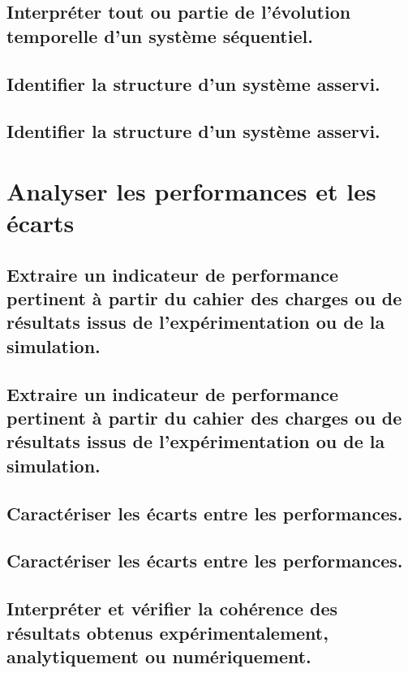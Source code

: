 \documentclass[10pt,fleqn]{book}
\begin{document}
\subsection{Interpréter tout ou partie de l’évolution temporelle d’un système séquentiel.} 

\subsection{Identifier la structure d'un système asservi.} 

\subsection{Identifier la structure d'un système asservi.} 

\section{Analyser les performances et les écarts} 

\subsection{Extraire un indicateur de performance pertinent à partir du cahier des charges ou de résultats issus de l'expérimentation ou de la simulation.} 

\subsection{Extraire un indicateur de performance pertinent à partir du cahier des charges ou de résultats issus de l'expérimentation ou de la simulation.} 

\subsection{Caractériser les écarts entre les performances.} 

\subsection{Caractériser les écarts entre les performances.} 

\subsection{Interpréter et vérifier la cohérence des résultats obtenus expérimentalement, analytiquement ou numériquement. } 
\end{document}
